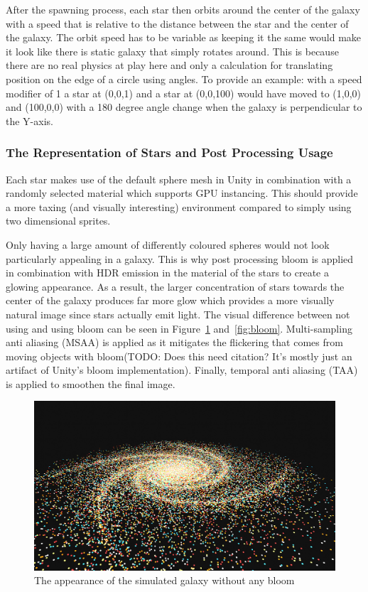 After the spawning process, each star then orbits around the center of the galaxy with a speed that is relative to the distance between the star and the center of the galaxy. The orbit speed has to be variable as keeping it the same would make it look like there is static galaxy that simply rotates around. This is because there are no real physics at play here and only a calculation for translating position on the edge of a circle using angles. To provide an example: with a speed modifier of 1 a star at (0,0,1) and a star at (0,0,100) would have moved to (1,0,0) and (100,0,0) with a 180 degree angle change when the galaxy is perpendicular to the Y-axis. 

\subsubsection{The Representation of Stars and Post Processing Usage}
Each star makes use of the default sphere mesh in Unity in combination with a randomly selected material which supports GPU instancing. This should provide a more taxing (and visually interesting) environment compared to simply using two dimensional sprites. 

Only having a large amount of differently coloured spheres would not look particularly appealing in a galaxy. This is why post processing bloom is applied in combination with HDR emission in the material of the stars to create a glowing appearance. As a result, the larger concentration of stars towards the center of the galaxy produces far more glow which provides a more visually natural image since stars actually emit light. The visual difference between not using and using bloom can be seen in Figure~\ref{fig:nobloom} and~\ref{fig:bloom}.
Multi-sampling anti aliasing (MSAA) is applied as it mitigates the flickering that comes from moving objects with bloom(TODO: Does this need citation? It's mostly just an artifact of Unity's bloom implementation). Finally, temporal anti aliasing (TAA) is applied to smoothen the final image. 

\begin{figure}[tbph]
    \centering
    \includegraphics[width=1\textwidth]{Figures/noBloom.png}
    \caption[Galaxy without bloom]{The appearance of the simulated galaxy without any bloom}
    \label{fig:nobloom}
\end{figure}

